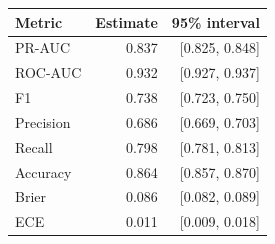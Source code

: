 \begin{tabular}{lrr}
\toprule
Metric & Estimate & 95\% interval \\
\midrule
PR-AUC & 0.837 & [0.825, 0.848] \\
ROC-AUC & 0.932 & [0.927, 0.937] \\
F1 & 0.738 & [0.723, 0.750] \\
Precision & 0.686 & [0.669, 0.703] \\
Recall & 0.798 & [0.781, 0.813] \\
Accuracy & 0.864 & [0.857, 0.870] \\
Brier & 0.086 & [0.082, 0.089] \\
ECE & 0.011 & [0.009, 0.018] \\
\bottomrule
\end{tabular}
